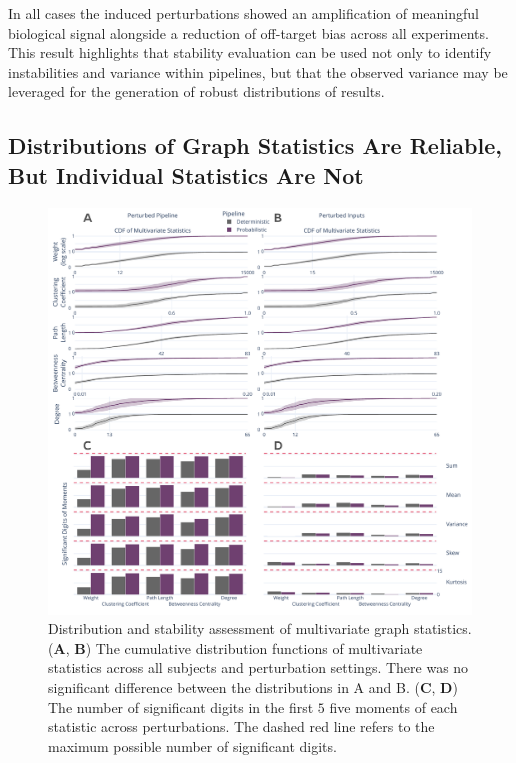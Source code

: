 \documentclass[fleqn,10pt]{SelfArx} %
\begin{document}
In all cases the induced perturbations showed an amplification of meaningful biological signal alongside a reduction of
off-target bias across all experiments. This result highlights that stability evaluation can be used not only to
identify instabilities and variance within pipelines, but that the observed variance may be leveraged for the
generation of robust distributions of results.

\subsection*{Distributions of Graph Statistics Are Reliable, But Individual Statistics Are Not}
\begin{figure}[bht!]\centering
\includegraphics[width=\linewidth]{figures/fig2_multivariate_differences.pdf}
\caption{Distribution and stability assessment of multivariate graph statistics. (\textbf{A}, \textbf{B}) The
cumulative distribution functions of multivariate statistics across all subjects and perturbation settings. There was
no significant difference between the distributions in A and B. (\textbf{C}, \textbf{D}) The number of significant
digits in the first $5$ five moments of each statistic across perturbations. The dashed red line refers to the maximum
possible number of significant digits.}
\label{fig:multivar}
\end{figure}
\end{document}
